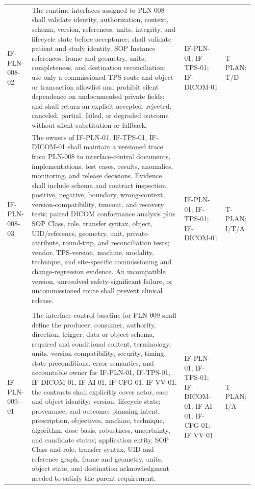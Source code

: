 \documentclass[11pt,letterpaper]{article}
\begin{document}
\begin{scriptsize}
\begin{longtable}{@{}L{0.14\textwidth}L{0.49\textwidth}L{0.19\textwidth}L{0.10\textwidth}@{}}
\addlinespace[2pt]
\mbox{IF-PLN-008-02} & The runtime interfaces assigned to PLN-008 shall validate identity, authorization, context, schema, version, references, units, integrity, and lifecycle state before acceptance; shall validate patient and study identity, SOP Instance references, frame and geometry, units, completeness, and destination reconciliation; use only a commissioned TPS route and object or transaction allowlist and prohibit silent dependence on undocumented private fields; and shall return an explicit accepted, rejected, canceled, partial, failed, or degraded outcome without silent substitution or fallback. & IF-PLN-01; IF-TPS-01; IF-DICOM-01 & T-PLAN; T\slash\allowbreak{}D \\
\addlinespace[2pt]
\mbox{IF-PLN-008-03} & The owners of IF-PLN-01, IF-TPS-01, IF-DICOM-01 shall maintain a versioned trace from PLN-008 to interface-control documents, implementations, test cases, results, anomalies, monitoring, and release decisions. Evidence shall include schema and contract inspection; positive, negative, boundary, wrong-context, version-compatibility, timeout, and recovery tests; paired DICOM conformance analysis plus SOP Class, role, transfer syntax, object, UID\slash\allowbreak{}reference, geometry, unit, private-attribute, round-trip, and reconciliation tests; vendor, TPS-version, machine, modality, technique, and site-specific commissioning and change-regression evidence. An incompatible version, unresolved safety-significant failure, or uncommissioned route shall prevent clinical release. & IF-PLN-01; IF-TPS-01; IF-DICOM-01 & T-PLAN; I\slash\allowbreak{}T\slash\allowbreak{}A \\
\addlinespace[2pt]
 \\
\addlinespace[2pt]
\mbox{IF-PLN-009-01} & The interface-control baseline for PLN-009 shall define the producer, consumer, authority, direction, trigger, data or object schema, required and conditional content, terminology, units, version compatibility, security, timing, state preconditions, error semantics, and accountable owner for IF-PLN-01, IF-TPS-01, IF-DICOM-01, IF-AI-01, IF-CFG-01, IF-VV-01; the contracts shall explicitly cover actor, case and object identity; version; lifecycle state; provenance; and outcome; planning intent, prescription, objectives, machine, technique, algorithm, dose basis, robustness, uncertainty, and candidate status; application entity, SOP Class and role, transfer syntax, UID and reference graph, frame and geometry, units, object state, and destination acknowledgment needed to satisfy the parent requirement. & IF-PLN-01; IF-TPS-01; IF-DICOM-01; IF-AI-01; IF-CFG-01; IF-VV-01 & T-PLAN; I\slash\allowbreak{}A \\

\end{longtable}
\end{scriptsize}
\end{document}
